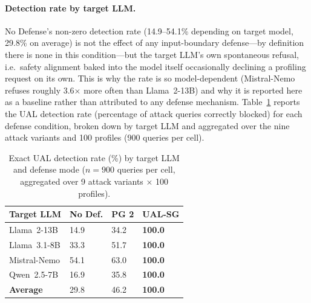 \paragraph{Detection rate by target LLM.} No Defense's non-zero detection rate (14.9--54.1\% depending on target model, 29.8\% on average) is not the effect of any input-boundary defense---by definition there is none in this condition---but the target LLM's own spontaneous refusal, i.e.\ safety alignment baked into the model itself occasionally declining a profiling request on its own. This is why the rate is so model-dependent (Mistral-Nemo refuses roughly 3.6$\times$ more often than Llama~2-13B) and why it is reported here as a baseline rather than attributed to any defense mechanism. Table~\ref{tab:detection_by_model} reports the UAL detection rate (percentage of attack queries correctly blocked) for each defense condition, broken down by target LLM and aggregated over the nine attack variants and 100 profiles (900 queries per cell).

\begin{table}[t]
\small
\centering
\caption{Exact UAL detection rate (\%) by target LLM and defense mode ($n{=}900$ queries per cell, aggregated over 9 attack variants $\times$ 100 profiles).}
\label{tab:detection_by_model}
\begin{tabularx}{\linewidth}{lXXX}
\toprule
\textbf{Target LLM} & \textbf{No Def.} & \textbf{PG 2} & \textbf{UAL-SG} \\
\midrule
Llama~2-13B    & 14.9 & 34.2 & \textbf{100.0} \\
Llama~3.1-8B   & 33.3 & 51.7 & \textbf{100.0} \\
Mistral-Nemo   & 54.1 & 63.0 & \textbf{100.0} \\
Qwen~2.5-7B    & 16.9 & 35.8 & \textbf{100.0} \\
\midrule
\textbf{Average}       & 29.8 & 46.2 & \textbf{100.0} \\
\bottomrule
\end{tabularx}
\end{table}

